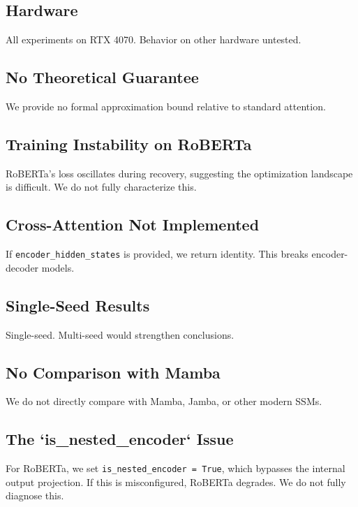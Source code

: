 \subsection{Hardware}

All experiments on RTX 4070. Behavior on other hardware untested.

\subsection{No Theoretical Guarantee}

We provide no formal approximation bound relative to standard attention.

\subsection{Training Instability on RoBERTa}

RoBERTa's loss oscillates during recovery, suggesting the optimization 
landscape is difficult. We do not fully characterize this.

\subsection{Cross-Attention Not Implemented}

If \texttt{encoder\_hidden\_states} is provided, we return identity. This breaks 
encoder-decoder models.

\subsection{Single-Seed Results}

Single-seed. Multi-seed would strengthen conclusions.

\subsection{No Comparison with Mamba}

We do not directly compare with Mamba, Jamba, or other modern SSMs.

\subsection{The `is\_nested\_encoder` Issue}

For RoBERTa, we set \texttt{is\_nested\_encoder = True}, which bypasses the internal 
output projection. If this is misconfigured, RoBERTa degrades. We do not 
fully diagnose this.

